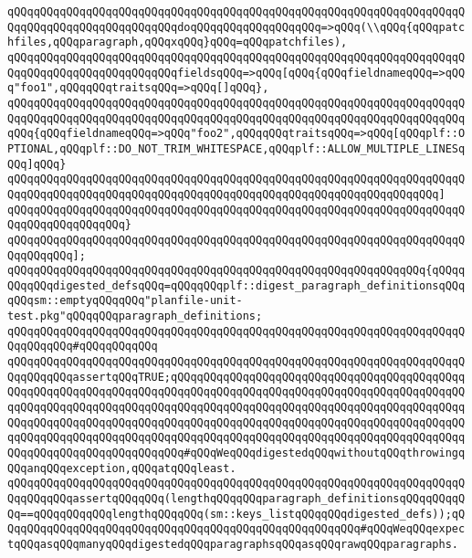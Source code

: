 \verb|qQQqqQQqqQQqqQQqqQQqqQQqqQQqqQQqqQQqqQQqqQQqqQQqqQQqqQQqqQQqqQQqqQQqqQQqqQQqqQQqqQQqqQQqqQQqqQQqdoqQQqqQQqqQQqqQQqqQQq=>qQQq(\\qQQq{qQQqpatchfiles,qQQqparagraph,qQQqxqQQq}qQQq=qQQqpatchfiles),|\newline
\verb|qQQqqQQqqQQqqQQqqQQqqQQqqQQqqQQqqQQqqQQqqQQqqQQqqQQqqQQqqQQqqQQqqQQqqQQqqQQqqQQqqQQqqQQqqQQqqQQqfieldsqQQq=>qQQq[qQQq{qQQqfieldnameqQQq=>qQQq"foo1",qQQqqQQqtraitsqQQq=>qQQq[]qQQq},|\newline
\verb|qQQqqQQqqQQqqQQqqQQqqQQqqQQqqQQqqQQqqQQqqQQqqQQqqQQqqQQqqQQqqQQqqQQqqQQqqQQqqQQqqQQqqQQqqQQqqQQqqQQqqQQqqQQqqQQqqQQqqQQqqQQqqQQqqQQqqQQqqQQqqQQq{qQQqfieldnameqQQq=>qQQq"foo2",qQQqqQQqtraitsqQQq=>qQQq[qQQqplf::OPTIONAL,qQQqplf::DO_NOT_TRIM_WHITESPACE,qQQqplf::ALLOW_MULTIPLE_LINESqQQq]qQQq}|\newline
\verb|qQQqqQQqqQQqqQQqqQQqqQQqqQQqqQQqqQQqqQQqqQQqqQQqqQQqqQQqqQQqqQQqqQQqqQQqqQQqqQQqqQQqqQQqqQQqqQQqqQQqqQQqqQQqqQQqqQQqqQQqqQQqqQQqqQQqqQQq]|\newline
\verb|qQQqqQQqqQQqqQQqqQQqqQQqqQQqqQQqqQQqqQQqqQQqqQQqqQQqqQQqqQQqqQQqqQQqqQQqqQQqqQQqqQQqqQQq}|\newline
\newline
\verb|qQQqqQQqqQQqqQQqqQQqqQQqqQQqqQQqqQQqqQQqqQQqqQQqqQQqqQQqqQQqqQQqqQQqqQQqqQQqqQQq];|\newline
\newline
\verb|qQQqqQQqqQQqqQQqqQQqqQQqqQQqqQQqqQQqqQQqqQQqqQQqqQQqqQQqqQQqqQQq{qQQqqQQqqQQqdigested_defsqQQq=qQQqqQQqplf::digest_paragraph_definitionsqQQqqQQqsm::emptyqQQqqQQq"planfile-unit-test.pkg"qQQqqQQqparagraph_definitions;|\newline
\verb|qQQqqQQqqQQqqQQqqQQqqQQqqQQqqQQqqQQqqQQqqQQqqQQqqQQqqQQqqQQqqQQqqQQqqQQqqQQqqQQq#qQQqqQQqqQQq|\newline
\verb|qQQqqQQqqQQqqQQqqQQqqQQqqQQqqQQqqQQqqQQqqQQqqQQqqQQqqQQqqQQqqQQqqQQqqQQqqQQqqQQqassertqQQqTRUE;qQQqqQQqqQQqqQQqqQQqqQQqqQQqqQQqqQQqqQQqqQQqqQQqqQQqqQQqqQQqqQQqqQQqqQQqqQQqqQQqqQQqqQQqqQQqqQQqqQQqqQQqqQQqqQQqqQQqqQQqqQQqqQQqqQQqqQQqqQQqqQQqqQQqqQQqqQQqqQQqqQQqqQQqqQQqqQQqqQQqqQQqqQQqqQQqqQQqqQQqqQQqqQQqqQQqqQQqqQQqqQQqqQQqqQQqqQQqqQQqqQQqqQQqqQQqqQQqqQQqqQQqqQQqqQQqqQQqqQQqqQQqqQQqqQQqqQQqqQQqqQQqqQQqqQQqqQQqqQQqqQQqqQQqqQQqqQQqqQQqqQQqqQQqqQQq#qQQqWeqQQqdigestedqQQqwithoutqQQqthrowingqQQqanqQQqexception,qQQqatqQQqleast.|\newline
\newline
\verb|qQQqqQQqqQQqqQQqqQQqqQQqqQQqqQQqqQQqqQQqqQQqqQQqqQQqqQQqqQQqqQQqqQQqqQQqqQQqqQQqassertqQQqqQQq(lengthqQQqqQQqparagraph_definitionsqQQqqQQqqQQq==qQQqqQQqqQQqlengthqQQqqQQq(sm::keys_listqQQqqQQqdigested_defs));qQQqqQQqqQQqqQQqqQQqqQQqqQQqqQQqqQQqqQQqqQQqqQQqqQQqqQQq#qQQqWeqQQqexpectqQQqasqQQqmanyqQQqdigestedqQQqparagraphsqQQqasqQQqrawqQQqparagraphs.|\newline
